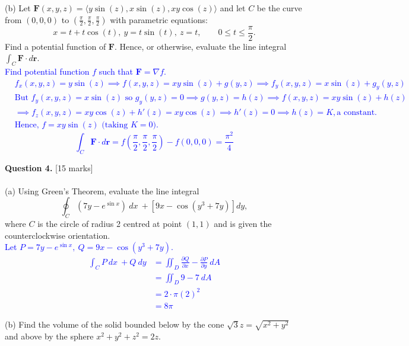 \documentclass[12pt]{article}
\begin{document}
(b) Let $\mathbf{F}(x,y,z)=\langle y\sin(z),x\sin(z),xy\cos(z)\rangle$ and let $C$ be the curve from $(0,0,0)$ to $(\frac{\pi}{2},\frac{\pi}{2},\frac{\pi}{2})$ with parametric equations:
\[
x=t+t\cos(t),\ y=t\sin(t),\ z=t,\qquad 0\leq t\leq\frac{\pi}{2}.
\]
\indent\indent Find a potential function of $\mathbf{F}$. Hence, or otherwise, evaluate the line integral $\int_C\mathbf{F}\cdot d\mathbf{r}$.\\

\textcolor{blue}{
Find potential function $f$ such that $\mathbf{F}=\nabla f$. \begin{align*}
	&f_x(x,y,z)=y\sin(z) \implies f(x,y,z)=xy\sin(z)+g(y,z)\implies f_y(x,y,z)=x\sin(z)+g_y(y,z)\\
	&\text{But }f_y(x,y,z)=x\sin(z)\text{ so } g_y(y,z)=0\implies g(y,z)=h(z)\implies f(x,y,z)=xy\sin(z)+h(z)\\
	&\implies f_z(x,y,z)=xy\cos(z)+h'(z)=xy\cos(z)\implies h'(z)=0\implies h(z)=K,\text{a constant.}\\
	&\text{Hence, }f=xy\sin(z)\text{ (taking }K=0).
\end{align*}
\[
\int_C\mathbf{F}\cdot d\mathbf{r}=f(\frac{\pi}{2},\frac{\pi}{2},\frac{\pi}{2})-f(0,0,0)=\frac{\pi^2}{4}
\]
}

{\bf Question 4.} [15 marks]\\
\\\indent
(a) Using Green's Theorem, evaluate the line integral
\[
\oint_C(7y-e^{\sin x})\ dx\ +[9x-\cos(y^3+7y)]dy,
\]
\indent\indent where $C$ is the circle of radius 2 centred at point $(1,1)$ and is given the counterclockwise orientation.\\

\textcolor{blue}{
Let $P=7y-e^{\sin x},\ Q=9x-\cos(y^3+7y)$.
\begin{align*}
	\int_CP\ dx\ +Q\ dy&=\iint_D\frac{\partial Q}{\partial x}-\frac{\partial P}{\partial y}\ dA\\
	&=\iint_D 9-7\ dA\\
	&=2\cdot \pi(2)^2\\
	&=8\pi
\end{align*}
}

(b) Find the volume of the solid bounded below by the cone $\sqrt{3}z=\sqrt{x^2+y^2}$ and above by the sphere $x^2+y^2+z^2=2z$.\\
\end{document}
